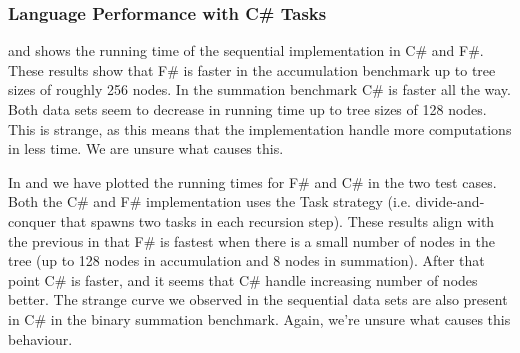 \subsubsection{Language Performance with C\# Tasks}
 and  shows the running time of the sequential implementation in C\# and F\#. These results show that F\# is faster in the accumulation benchmark up to tree sizes of roughly 256 nodes. In the summation benchmark C\# is faster all the way. Both data sets seem to decrease in running time up to tree sizes of 128 nodes. This is strange, as this means that the implementation handle more computations in less time. We are unsure what causes this. 


In  and  we have plotted the running times for F\# and C\# in the two test cases. Both the C\# and F\# implementation uses the Task strategy (i.e. divide-and-conquer that spawns two tasks in each recursion step). These results align with the previous in that F\# is fastest when there is a small number of nodes in the tree (up to 128 nodes in accumulation and 8 nodes in summation). After that point C\# is faster, and it seems that C\# handle increasing number of nodes better. The strange curve we observed in the sequential data sets are also present in C\# in the binary summation benchmark. Again, we're unsure what causes this behaviour.

